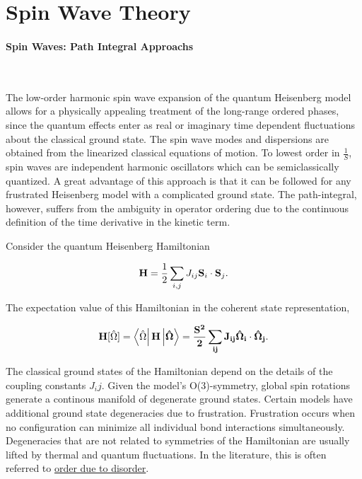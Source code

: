 \documentclass{homework}
\begin{document}
\clearpage

\section{\textbf{Spin Wave Theory}}

\paragraph{Spin Waves: Path Integral Approachs}

\blanky \\

\begin{tcolorbox}[colback = yellow, title = Physical Context]

The low-order harmonic spin wave expansion of the quantum Heisenberg model allows for a physically appealing treatment of the long-range ordered phases, since the quantum effects enter as real or imaginary time dependent fluctuations about the classical ground state. The spin wave modes and dispersions are obtained from the linearized classical equations of motion. To lowest order in $\frac{1}{S}$, spin waves are independent harmonic oscillators which can be semiclassically quantized. A great advantage of this approach is that it can be followed for any frustrated Heisenberg model with a complicated ground state. The path-integral, however, suffers from the ambiguity in operator ordering due to the continuous definition of the time derivative in the kinetic term. 

\end{tcolorbox}

Consider the quantum Heisenberg Hamiltonian 

$$
    {\bf H} = \frac{1}{2} \sum_{i,j} J_{ij} {\bf S}_i \cdot {\bf S}_j. 
$$

The expectation value of this Hamiltonian in the coherent state representation, 

\begin{equation}
    {\bf H}[\hat{\Omega}] = \bra{\hat{\Omega}} {\bf H} \ket{\hat{\Omega}} = \frac{S^2}{2} \sum_{ij} J_{ij} \hat{\Omega}_i \cdot \hat{\Omega}_j.
\end{equation}

The classical ground states of the Hamiltonian depend on the details of the coupling constants $J_ij$. Given the model's O(3)-symmetry, global spin rotations generate a continous manifold of degenerate ground states. Certain models have additional ground state degeneracies due to frustration. Frustration occurs when no configuration can minimize all individual bond interactions simultaneously. Degeneracies that are not related to symmetries of the Hamiltonian are usually lifted by thermal and quantum fluctuations. In the literature, this is often referred to \underline{order due to disorder}. \\
\end{document}
